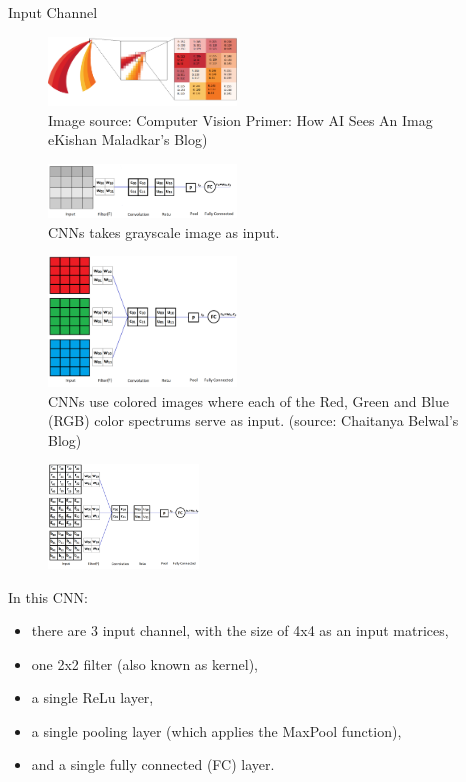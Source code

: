 \begin{vbframe}{Input Channel}
 \begin{figure}
    \centering
    \includegraphics[width=5cm]{figure/RGB-1.png}
    \caption{\tiny Image source: Computer Vision Primer: How AI Sees An Imag eKishan Maladkar's Blog)}
  \end{figure}

 \begin{figure}
    \centering
    \includegraphics[width=5cm]{figure/1channel.png}
    \caption{\tiny CNNs takes grayscale image as input.}
  \end{figure}


 \begin{figure}
    \centering
    \includegraphics[width=5cm]{figure/3channel.png}
    \caption{\tiny CNNs use colored images where each of the Red, Green and Blue (RGB) color spectrums serve as input. (source: Chaitanya Belwal's Blog)}
  \end{figure}

 \begin{figure}
    \centering
    \includegraphics[width=4cm]{figure/cnn-net.png}
  \end{figure}

In this CNN:
    \begin{itemize}
       \item there are 3 input channel, with the size of 4x4 as an input matrices, 
       \item one 2x2 filter (also known as kernel), 
       \item a single ReLu layer,
       \item a single pooling layer (which applies the MaxPool function),
       \item and a single fully connected (FC) layer.
    \end{itemize}


\end{vbframe}
